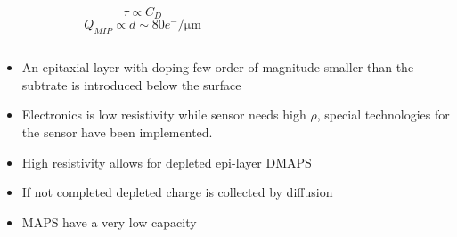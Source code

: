 \begin{frame}
\begin{columns}
\begin{equation*}
                    \hspace{80pt} \tau \propto C_D
                \end{equation*}  
                \begin{equation*}
                    \hspace{80pt} Q_{MIP}\propto d \sim 80 e^-/\si{\um}
                \end{equation*}  
            \end{columns}   
        \medskip 
        \begin{itemize}
            \item An epitaxial layer with doping few order of magnitude smaller than the subtrate is introduced below the surface
            \item Electronics is low resistivity while sensor needs high $\rho$, special technologies for the sensor have been implemented. 
            \item High resistivity allows for depleted epi-layer DMAPS
            \item If not completed depleted charge is collected by diffusion
            \item MAPS have a very low capacity 
        \end{itemize}
    \end{frame} 


